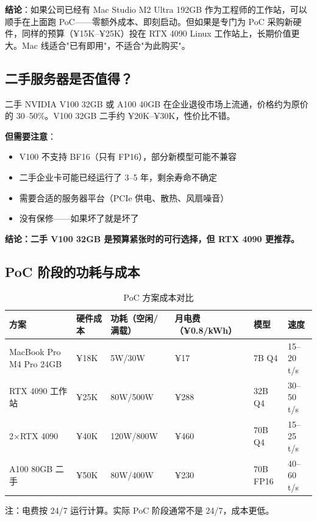 \documentclass[UTF8,a4paper,10pt,oneside]{ctexart}
\begin{document}
\textbf{结论}：如果公司已经有 Mac Studio M2 Ultra 192GB 作为工程师的工作站，可以顺手在上面跑 PoC——零额外成本、即刻启动。但如果是专门为 PoC 采购新硬件，同样的预算（¥15K--¥25K）投在 RTX 4090 Linux 工作站上，长期价值更大。Mac 线适合"已有即用"，不适合"为此购买"。

\subsection{二手服务器是否值得？}

二手 NVIDIA V100 32GB 或 A100 40GB 在企业退役市场上流通，价格约为原价的 30--50\%。V100 32GB 二手约 ¥20K--¥30K，性价比不错。

\textbf{但需要注意}：
\begin{itemize}
    \item V100 不支持 BF16（只有 FP16），部分新模型可能不兼容
    \item 二手企业卡可能已经运行了 3--5 年，剩余寿命不确定
    \item 需要合适的服务器平台（PCIe 供电、散热、风扇噪音）
    \item 没有保修——如果坏了就是坏了
\end{itemize}

\textbf{结论：二手 V100 32GB 是预算紧张时的可行选择，但 RTX 4090 更推荐。}

\subsection{PoC 阶段的功耗与成本}

\begin{table}[htbp]
\centering
\caption{PoC 方案成本对比}
\begin{tabular}{p{3cm}p{1.5cm}p{1.5cm}p{1.5cm}p{2cm}p{1.5cm}}
\hline
\textbf{方案} & \textbf{硬件成本} & \textbf{功耗（空闲/满载）} & \textbf{月电费（¥0.8/kWh）} & \textbf{模型} & \textbf{速度} \\
\hline
MacBook Pro M4 Pro 24GB & ¥18K& 5W/30W & ¥17 & 7B Q4 & 15--20 t/s \\
RTX 4090 工作站 & ¥25K & 80W/500W & ¥288 & 32B Q4 & 30--50 t/s \\
2$\times$RTX 4090 & ¥40K & 120W/800W & ¥460 & 70B Q4 & 15--25 t/s \\
A100 80GB 二手 & ¥50K & 80W/400W & ¥230 & 70B FP16 & 40--60 t/s \\
\hline
\end{tabular}
\end{table}

注：电费按 24/7 运行计算。实际 PoC 阶段通常不是 24/7，成本更低。
\end{document}
